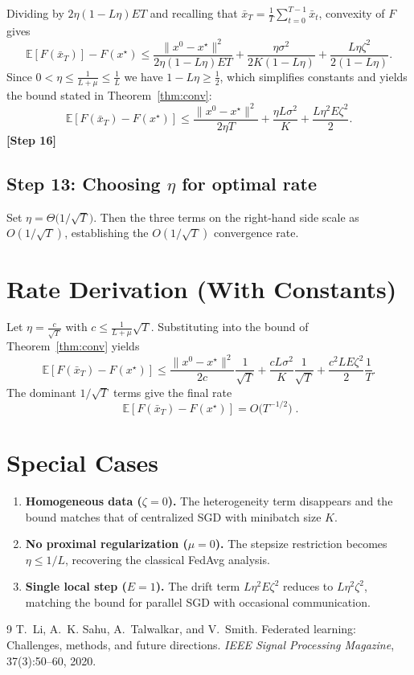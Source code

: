 \documentclass[11pt]{article}
\begin{document}
Dividing by $2\eta(1-L\eta)ET$ and recalling that $\bar{x}_{T}=\frac{1}{T}\sum_{t=0}^{T-1}\bar{x}_{t}$, convexity of $F$ gives
\[
    \mathbb{E}[F(\bar{x}_{T})]-F(x^{\star})
    \le \frac{\|x^{0}-x^{\star}\|^{2}}{2\eta(1-L\eta)ET}
       +\frac{\eta\sigma^{2}}{2K(1-L\eta)}
       +\frac{L\eta\zeta^{2}}{2(1-L\eta)}.
\]
Since $0<\eta\le\frac{1}{L+\mu}\le\frac{1}{L}$ we have $1-L\eta\ge\frac{1}{2}$, which simplifies constants and yields the bound stated in Theorem~\ref{thm:conv}:
\[
    \mathbb{E}[F(\bar{x}_{T})-F(x^{\star})]
    \le \frac{\|x^{0}-x^{\star}\|^{2}}{2\eta T}
       +\frac{\eta L\sigma^{2}}{K}
       +\frac{L\eta^{2}E\zeta^{2}}{2}.
\]
\textbf{[Step 16]}

\subsection*{Step 13: Choosing $\eta$ for optimal rate}
Set $\eta=\Theta\!\bigl(1/\sqrt{T}\bigr)$. Then the three terms on the right‑hand side scale as $O(1/\sqrt{T})$, establishing the $O(1/\sqrt{T})$ convergence rate.

\section*{Rate Derivation (With Constants)}
Let $\eta = \frac{c}{\sqrt{T}}$ with $c\le\frac{1}{L+\mu}\sqrt{T}$. Substituting into the bound of Theorem~\ref{thm:conv} yields
\[
\mathbb{E}[F(\bar{x}_{T})-F(x^{\star})]
\le \frac{\|x^{0}-x^{\star}\|^{2}}{2c}\frac{1}{\sqrt{T}}
   +\frac{cL\sigma^{2}}{K}\frac{1}{\sqrt{T}}
   +\frac{c^{2}L E\zeta^{2}}{2}\frac{1}{T}.
\]
The dominant $1/\sqrt{T}$ terms give the final rate
\[
\boxed{\;\mathbb{E}[F(\bar{x}_{T})-F(x^{\star})]=O\!\bigl(T^{-1/2}\bigr)\; } .
\]

\section*{Special Cases}
\begin{enumerate}
    \item \textbf{Homogeneous data ($\zeta=0$).} The heterogeneity term disappears and the bound matches that of centralized SGD with minibatch size $K$.
    \item \textbf{No proximal regularization ($\mu=0$).} The stepsize restriction becomes $\eta\le 1/L$, recovering the classical FedAvg analysis.
    \item \textbf{Single local step ($E=1$).} The drift term $L\eta^{2}E\zeta^{2}$ reduces to $L\eta^{2}\zeta^{2}$, matching the bound for parallel SGD with occasional communication.
\end{enumerate}

\begin{thebibliography}{9}
T.~Li, A.~K. Sahu, A.~Talwalkar, and V.~Smith.
\newblock Federated learning: Challenges, methods, and future directions.
\newblock \emph{IEEE Signal Processing Magazine}, 37(3):50--60, 2020.
\end{thebibliography}
\end{document}
